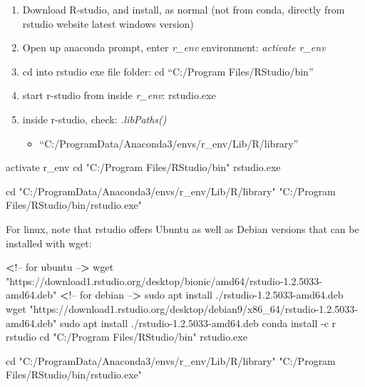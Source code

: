 \documentclass[]{article}
\newenvironment{Shaded}{\begin{snugshade}}{\end{snugshade}}
\newcommand{\BuiltInTok}[1]{#1}
\newcommand{\ExtensionTok}[1]{#1}
\newcommand{\FunctionTok}[1]{\textcolor[rgb]{0.00,0.00,0.00}{#1}}
\newcommand{\NormalTok}[1]{#1}
\newcommand{\OperatorTok}[1]{\textcolor[rgb]{0.81,0.36,0.00}{\textbf{#1}}}
\newcommand{\StringTok}[1]{\textcolor[rgb]{0.31,0.60,0.02}{#1}}
\providecommand{\tightlist}{%
  \setlength{\itemsep}{0pt}\setlength{\parskip}{0pt}}
\begin{document}
\begin{enumerate}
\def\labelenumi{\arabic{enumi}.}
\tightlist
\item
  Download R-studio, and install, as normal (not from conda, directly
  from rstudio website latest windows version)
\item
  Open up anaconda prompt, enter \emph{r\_env} environment:
  \emph{activate r\_env}
\item
  cd into rstudio exe file folder: cd ``C:/Program Files/RStudio/bin''
\item
  start r-studio from inside \emph{r\_env}: rstudio.exe
\item
  inside r-studio, check: \emph{.libPaths()}

  \begin{itemize}
  \tightlist
  \item
    ``C:/ProgramData/Anaconda3/envs/r\_env/Lib/R/library''
  \end{itemize}
\end{enumerate}

\begin{Shaded}
\begin{Highlighting}[]
\ExtensionTok{activate}\NormalTok{ r_env}
\BuiltInTok{cd} \StringTok{"C:/Program Files/RStudio/bin"}
\ExtensionTok{rstudio.exe}

\BuiltInTok{cd} \StringTok{"C:/ProgramData/Anaconda3/envs/r_env/Lib/R/library"}
\StringTok{"C:/Program Files/RStudio/bin/rstudio.exe"}
\end{Highlighting}
\end{Shaded}

For linux, note that rstudio offers Ubuntu as well as Debian versions
that can be installed with wget:

\begin{Shaded}
\begin{Highlighting}[]
\OperatorTok{<}\NormalTok{!}\ExtensionTok{--}\NormalTok{ for ubuntu --}\OperatorTok{>}
\FunctionTok{wget} \StringTok{"https://download1.rstudio.org/desktop/bionic/amd64/rstudio-1.2.5033-amd64.deb"}
\OperatorTok{<}\NormalTok{!}\ExtensionTok{--}\NormalTok{ for debian --}\OperatorTok{>}
\FunctionTok{sudo}\NormalTok{ apt install ./rstudio-1.2.5033-amd64.deb}
\FunctionTok{wget} \StringTok{"https://download1.rstudio.org/desktop/debian9/x86_64/rstudio-1.2.5033-amd64.deb"}
\FunctionTok{sudo}\NormalTok{ apt install ./rstudio-1.2.5033-amd64.deb}
\ExtensionTok{conda}\NormalTok{ install -c r rstudio}
\BuiltInTok{cd} \StringTok{"C:/Program Files/RStudio/bin"}
\ExtensionTok{rstudio.exe}

\BuiltInTok{cd} \StringTok{"C:/ProgramData/Anaconda3/envs/r_env/Lib/R/library"}
\StringTok{"C:/Program Files/RStudio/bin/rstudio.exe"}
\end{Highlighting}
\end{Shaded}
\end{document}
